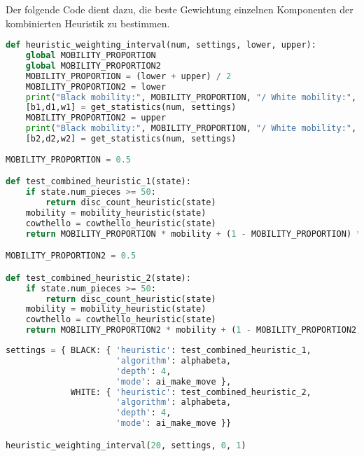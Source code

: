 Der folgende Code dient dazu, die beste Gewichtung einzelnen Komponenten
der kombinierten Heuristik zu bestimmen.

\begin{lstlisting}[language=Python]
def heuristic_weighting_interval(num, settings, lower, upper):
    global MOBILITY_PROPORTION
    global MOBILITY_PROPORTION2
    MOBILITY_PROPORTION = (lower + upper) / 2
    MOBILITY_PROPORTION2 = lower
    print("Black mobility:", MOBILITY_PROPORTION, "/ White mobility:", MOBILITY_PROPORTION2)
    [b1,d1,w1] = get_statistics(num, settings)
    MOBILITY_PROPORTION2 = upper
    print("Black mobility:", MOBILITY_PROPORTION, "/ White mobility:", MOBILITY_PROPORTION2)
    [b2,d2,w2] = get_statistics(num, settings)
    
MOBILITY_PROPORTION = 0.5

def test_combined_heuristic_1(state):
    if state.num_pieces >= 50:
        return disc_count_heuristic(state)
    mobility = mobility_heuristic(state)
    cowthello = cowthello_heuristic(state)
    return MOBILITY_PROPORTION * mobility + (1 - MOBILITY_PROPORTION) * cowthello

MOBILITY_PROPORTION2 = 0.5

def test_combined_heuristic_2(state):
    if state.num_pieces >= 50:
        return disc_count_heuristic(state)
    mobility = mobility_heuristic(state)
    cowthello = cowthello_heuristic(state)
    return MOBILITY_PROPORTION2 * mobility + (1 - MOBILITY_PROPORTION2) * cowthello
\end{lstlisting}

\begin{lstlisting}[language=Python]
settings = { BLACK: { 'heuristic': test_combined_heuristic_1,
                      'algorithm': alphabeta,
                      'depth': 4,
                      'mode': ai_make_move },
             WHITE: { 'heuristic': test_combined_heuristic_2,
                      'algorithm': alphabeta,
                      'depth': 4,
                      'mode': ai_make_move }}

heuristic_weighting_interval(20, settings, 0, 1)
\end{lstlisting}
